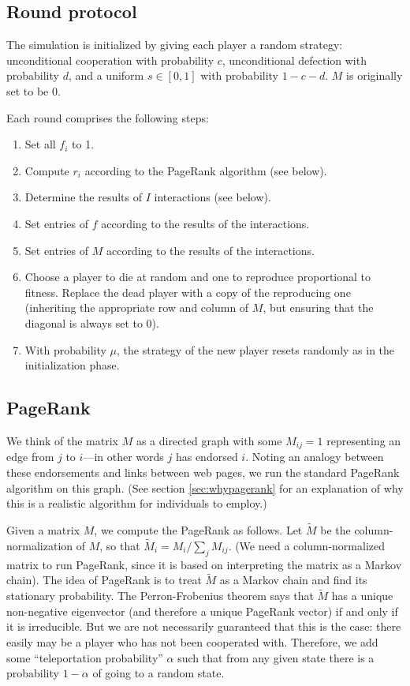 \documentclass{amsart}
\begin{document}
\subsection{Round protocol}
The simulation is initialized by giving each player a random strategy:
unconditional cooperation with probability $c$, unconditional
defection with probability $d$, and a uniform $s \in [0,1]$ with
probability $1 - c- d$. $M$ is originally set to be $0$.

Each round comprises the following steps:

\begin{enumerate}
\item Set all $f_i$ to 1.
\item Compute $r_i$ according to the PageRank algorithm (see below).
\item Determine the results of $I$ interactions (see below).
\item Set entries of $f$ according to the results of the interactions.
\item Set entries of $M$ according to the results of the interactions.
\item Choose a player to die at random and one to reproduce
  proportional to fitness. Replace the dead player with a copy of the
  reproducing one (inheriting the appropriate row and column of $M$,
  but ensuring that the diagonal is always set to 0).
\item With probability $\mu$, the strategy of the new player resets
  randomly as in the initialization phase.
\end{enumerate}

\subsection{PageRank}
\newcommand{\tM}{\tilde M} We think of the matrix $M$ as a directed
graph with some $M_{ij} = 1$ representing an edge from $j$ to $i$---in
other words $j$ has endorsed $i$. Noting an analogy between these
endorsements and links between web pages, we run the standard PageRank
algorithm \cite{page_pagerank_1999} on this graph. (See section
\ref{sec:whypagerank} for an explanation of why this is a realistic
algorithm for individuals to employ.)

Given a matrix $M$, we compute the PageRank as follows. Let $\tM$ be
the column-normalization of $M$, so that $\tM_i = M_i / \sum_j
M_{ij}$. (We need a column-normalized matrix to run PageRank, since it
is based on interpreting the matrix as a Markov chain). The idea of
PageRank is to treat $\tM$ as a Markov chain and find its stationary
probability. The Perron-Frobenius theorem says that $\tM$ has a unique
non-negative eigenvector (and therefore a unique PageRank vector) if
and only if it is irreducible. But we are not necessarily guaranteed
that this is the case: there easily may be a player who has not been
cooperated with. Therefore, we add some ``teleportation probability''
$\alpha$ such that from any given state there is a probability
$1-\alpha$ of going to a random state.
\end{document}
